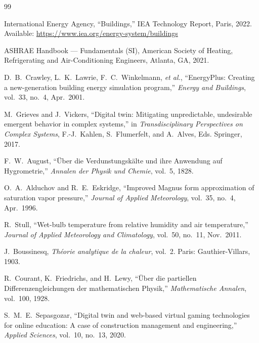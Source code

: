 \documentclass[12pt,a4paper]{report}
\begin{document}
\begin{thebibliography}{99}

International Energy Agency, ``Buildings,'' IEA Technology Report, Paris, 2022. Available: \url{https://www.iea.org/energy-system/buildings}

ASHRAE Handbook --- Fundamentals (SI), American Society of Heating, Refrigerating and Air-Conditioning Engineers, Atlanta, GA, 2021.

D.\ B.\ Crawley, L.\ K.\ Lawrie, F.\ C.\ Winkelmann, \emph{et al.}, ``EnergyPlus: Creating a new-generation building energy simulation program,'' \textit{Energy and Buildings}, vol.\ 33, no.\ 4, Apr.\ 2001.

M.\ Grieves and J.\ Vickers, ``Digital twin: Mitigating unpredictable, undesirable emergent behavior in complex systems,'' in \textit{Transdisciplinary Perspectives on Complex Systems}, F.-J.\ Kahlen, S.\ Flumerfelt, and A.\ Alves, Eds. Springer, 2017.

F.\ W.\ August, ``\"{U}ber die Verdunstungsk\"{a}lte und ihre Anwendung auf Hygrometrie,'' \textit{Annalen der Physik und Chemie}, vol.\ 5, 1828.

O.\ A.\ Alduchov and R.\ E.\ Eskridge, ``Improved Magnus form approximation of saturation vapor pressure,'' \textit{Journal of Applied Meteorology}, vol.\ 35, no.\ 4, Apr.\ 1996.

R.\ Stull, ``Wet-bulb temperature from relative humidity and air temperature,'' \textit{Journal of Applied Meteorology and Climatology}, vol.\ 50, no.\ 11, Nov.\ 2011.

J.\ Boussinesq, \textit{Th\'{e}orie analytique de la chaleur}, vol.\ 2. Paris: Gauthier-Villars, 1903.

R.\ Courant, K.\ Friedrichs, and H.\ Lewy, ``\"{U}ber die partiellen Differenzengleichungen der mathematischen Physik,'' \textit{Mathematische Annalen}, vol.\ 100, 1928.

S.\ M.\ E.\ Sepasgozar, ``Digital twin and web-based virtual gaming technologies for online education: A case of construction management and engineering,'' \textit{Applied Sciences}, vol.\ 10, no.\ 13, 2020.


\end{thebibliography}
\end{document}
